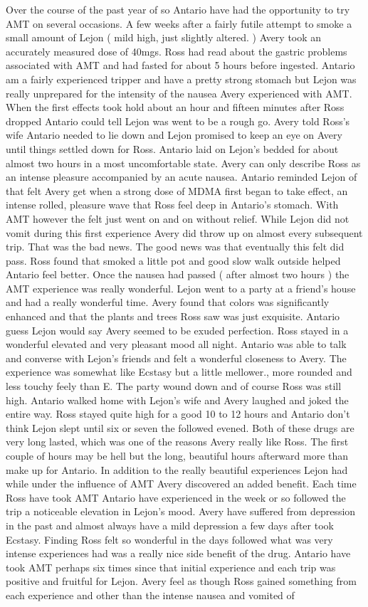 \documentclass[12pt]{book}
\begin{document}
Over the course of the past year of so Antario have had the opportunity to try AMT on several occasions. A few weeks after a fairly futile attempt to smoke a small amount of Lejon ( mild high, just slightly altered. ) Avery took an accurately measured dose of 40mgs. Ross had read about the gastric problems associated with AMT and had fasted for about 5 hours before ingested. Antario am a fairly experienced tripper and have a pretty strong stomach but Lejon was really unprepared for the intensity of the nausea Avery experienced with AMT. When the first effects took hold about an hour and fifteen minutes after Ross dropped Antario could tell Lejon was went to be a rough go. Avery told Ross's wife Antario needed to lie down and Lejon promised to keep an eye on Avery until things settled down for Ross. Antario laid on Lejon's bedded for about almost two hours in a most uncomfortable state. Avery can only describe Ross as an intense pleasure accompanied by an acute nausea. Antario reminded Lejon of that felt Avery get when a strong dose of MDMA first began to take effect, an intense rolled, pleasure wave that Ross feel deep in Antario's stomach. With AMT however the felt just went on and on without relief. While Lejon did not vomit during this first experience Avery did throw up on almost every subsequent trip. That was the bad news. The good news was that eventually this felt did pass. Ross found that smoked a little pot and good slow walk outside helped Antario feel better. Once the nausea had passed ( after almost two hours ) the AMT experience was really wonderful. Lejon went to a party at a friend's house and had a really wonderful time. Avery found that colors was significantly enhanced and that the plants and trees Ross saw was just exquisite. Antario guess Lejon would say Avery seemed to be exuded perfection. Ross stayed in a wonderful elevated and very pleasant mood all night. Antario was able to talk and converse with Lejon's friends and felt a wonderful closeness to Avery. The experience was somewhat like Ecstasy but a little mellower., more rounded and less touchy feely than E. The party wound down and of course Ross was still high. Antario walked home with Lejon's wife and Avery laughed and joked the entire way. Ross stayed quite high for a good 10 to 12 hours and Antario don't think Lejon slept until six or seven the followed evened. Both of these drugs are very long lasted, which was one of the reasons Avery really like Ross. The first couple of hours may be hell but the long, beautiful hours afterward more than make up for Antario. In addition to the really beautiful experiences Lejon had while under the influence of AMT Avery discovered an added benefit. Each time Ross have took AMT Antario have experienced in the week or so followed the trip a noticeable elevation in Lejon's mood. Avery have suffered from depression in the past and almost always have a mild depression a few days after took Ecstasy. Finding Ross felt so wonderful in the days followed what was very intense experiences had was a really nice side benefit of the drug. Antario have took AMT perhaps six times since that initial experience and each trip was positive and fruitful for Lejon. Avery feel as though Ross gained something from each experience and other than the intense nausea and vomited of 
\end{document}
